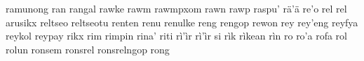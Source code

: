 ramunong\hspace{2mm}
ran\hspace{2mm}
rangal\hspace{2mm}
rawke\hspace{2mm}
rawm\hspace{2mm}
rawmpxom\hspace{2mm}
rawn\hspace{2mm}
rawp\hspace{2mm}
raspu'\hspace{2mm}
rä'ä\hspace{2mm}
re'o\hspace{2mm}
rel\hspace{2mm}
rel arusikx\hspace{2mm}
reltseo\hspace{2mm}
reltseotu\hspace{2mm}
renten\hspace{2mm}
renu\hspace{2mm}
renulke\hspace{2mm}
reng\hspace{2mm}
rengop\hspace{2mm}
rewon\hspace{2mm}
rey\hspace{2mm}
rey'eng\hspace{2mm}
reyfya\hspace{2mm}
reykol\hspace{2mm}
reypay\hspace{2mm}
rikx\hspace{2mm}
rim\hspace{2mm}
rimpin\hspace{2mm}
rina'\hspace{2mm}
riti\hspace{2mm}
rì'ìr\hspace{2mm}
rì'ìr si\hspace{2mm}
rìk\hspace{2mm}
rìkean\hspace{2mm}
rìn\hspace{2mm}
ro\hspace{2mm}
ro'a\hspace{2mm}
rofa\hspace{2mm}
rol\hspace{2mm}
rolun\hspace{2mm}
ronsem\hspace{2mm}
ronsrel\hspace{2mm}
ronsrelngop\hspace{2mm}
rong\hspace{2mm}
